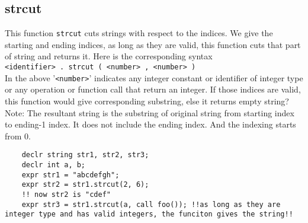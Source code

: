 \documentclass[journal, 18pt]{report}
\begin{document}
\subsection{strcut}
This function \texttt{strcut} cuts strings with respect to the indices. We give the starting and ending indices, as long as they are valid, this function cuts that part of string and returns it. Here is the corresponding syntax\\
\texttt{<identifier> . strcut ( <number> , <number> ) } \\
In the above '\texttt{<number>}' indicates any integer constant or identifier of integer type or any operation or function call that return an integer. If those indices are valid, this function would give corresponding substring, else it returns empty string? \\
Note: The resultant string is the substring of original string from starting index to ending-1 index. It does not include the ending index. And the indexing starts from 0.
\begin{lstlisting}
    declr string str1, str2, str3;
    declr int a, b;
    expr str1 = "abcdefgh";
    expr str2 = str1.strcut(2, 6);
    !! now str2 is "cdef"
    expr str3 = str1.strcut(a, call foo()); !!as long as they are integer type and has valid integers, the funciton gives the string!!
\end{lstlisting}
\end{document}
